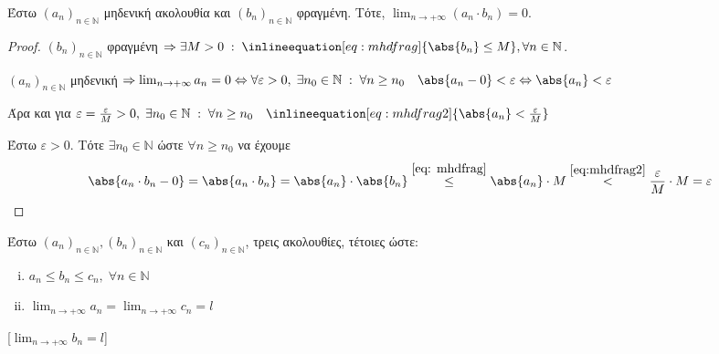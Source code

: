 \documentclass[main.tex]{subfiles}
\begin{document}
\begin{prop}
\item {}
    Έστω $ (a_{n})_{n \in \mathbb{N}} $ μηδενική ακολουθία και 
    $ (b_{n})_{n \in \mathbb{N}} $ 
    φραγμένη. Τότε, $ \lim_{n \to +\infty} (a_{n}\cdot b_{n}) = 0 $. 
\end{prop}

\begin{proof}
\item {}
    $ (b_{n})_{n \in \mathbb{N}} $ φραγμένη $ \Rightarrow \exists M>0 
    \; : \; \inlineequation[eq: mhdfrag]{\abs{b_{n}} \leq M}, 
    \forall n \in \mathbb{N} $.

    $ (a_{n})_{n \in \mathbb{N}} $ μηδενική $ \Rightarrow 
    \lim_{n \to +\infty} a_{n} = 0 \Leftrightarrow  \forall 
    \varepsilon >0, \; \exists n_{0} \in \mathbb{N} \; : \; \forall 
    n \geq n_{0} \quad \abs{a_{n}-0} < \varepsilon \Leftrightarrow 
    \abs{a_{n}} < \varepsilon $ 

    Άρα και για $ \varepsilon = \frac{\varepsilon}{M} >0, \; 
    \exists n_{0} \in \mathbb{N} \; : \; 
    \forall n \geq n_{0} \quad 
    \inlineequation[eq:mhdfrag2]{\abs{a_{n}} < \frac{\varepsilon}{M}} $ 

    Έστω $ \varepsilon >0 $. Τότε $ \exists n_{0} \in \mathbb{N} $ 
    ώστε $ \forall n \geq n_{0} $ να έχουμε 
    \[
        \abs{a_{n}\cdot b_{n} - 0} = \abs{a_{n}\cdot b_{n} } 
        = \abs{a_{n}} \cdot \abs{b_{n}} 
        \overset{\eqref{eq: mhdfrag}}{\leq} \abs{a_{n}} \cdot M 
        \overset{\eqref{eq:mhdfrag2}}{<} 
        \frac{\varepsilon}{M} \cdot M = \varepsilon
    \]
\end{proof}

\begin{prop}
\item {}
    Έστω $ (a_{n})_{n \in \mathbb{N}}, (b_{n})_{n \in \mathbb{N}} $ και 
    $ (c_{n})_{n \in \mathbb{N}} $, τρεις ακολουθίες, τέτοιες ώστε:

    \vspace{\baselineskip}

    \begin{minipage}{0.3\textwidth}
        \begin{enumerate}[i)]
            \item $ a_{n} \leq b_{n} \leq c_{n}, \; \forall n \in 
                \mathbb{N} $ \hfill {} 
            \item $ \lim_{n \to +\infty} a_{n} = \lim_{n \to +\infty} 
                c_{n} = l $ \hfill {}
        \end{enumerate}
    \end{minipage}

    [$ \lim_{n \to +\infty} b_{n} = l$]
\end{prop}
\end{document}
